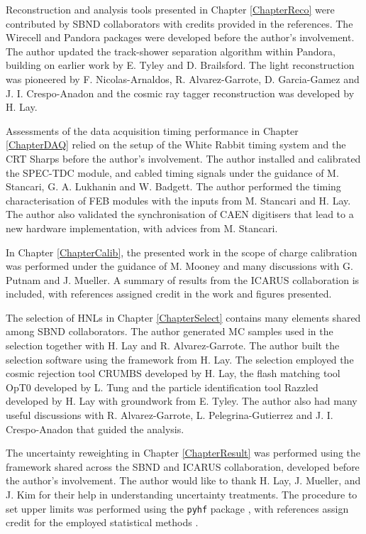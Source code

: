 \begin{declaration}
Reconstruction and analysis tools presented in Chapter \ref{ChapterReco} were contributed by SBND collaborators with credits provided in the references.
The Wirecell \cite{wirecell} and Pandora \cite{pandora} packages were developed before the author's involvement.
The author updated the track-shower separation algorithm within Pandora, building on earlier work by E. Tyley and D. Brailsford.
The light reconstruction was pioneered by F. Nicolas-Arnaldos, R. Alvarez-Garrote, D. Garcia-Gamez and J. I. Crespo-Anadon and the cosmic ray tagger reconstruction was developed by H. Lay.  

Assessments of the data acquisition timing performance in Chapter \ref{ChapterDAQ} relied on the setup of the White Rabbit timing system and the CRT Sharps before the author's involvement.
The author installed and calibrated the SPEC-TDC module, and cabled timing signals under the guidance of M. Stancari, G. A. Lukhanin and W. Badgett.
The author performed the timing characterisation of FEB modules with the inputs from M. Stancari and H. Lay.
The author also validated the synchronisation of CAEN digitisers that lead to a new hardware implementation, with advices from M. Stancari.

In Chapter \ref{ChapterCalib}, the presented work in the scope of charge calibration was performed under the guidance of M. Mooney and many discussions with G. Putnam and J. Mueller.
A summary of results from the ICARUS collaboration is included, with references assigned credit in the work and figures presented.

The selection of HNLs in Chapter \ref{ChapterSelect} contains many elements shared among SBND collaborators.
The author generated MC samples used in the selection together with H. Lay and R. Alvarez-Garrote.
The author built the selection software using the framework from H. Lay. 
The selection employed the cosmic rejection tool CRUMBS developed by H. Lay, the flash matching tool OpT0 developed by L. Tung and the particle identification tool Razzled developed by H. Lay with groundwork from E. Tyley.
The author also had many useful discussions with R. Alvarez-Garrote, L. Pelegrina-Gutierrez and J. I. Crespo-Anadon that guided the analysis.

The uncertainty reweighting in Chapter \ref{ChapterResult} was performed using the framework shared across the SBND and ICARUS collaboration, developed before the author's involvement.
The author would like to thank H. Lay, J. Mueller, and J. Kim for their help in understanding uncertainty treatments.
The procedure to set upper limits was performed using the \texttt{pyhf} package \cite{pyhf_joss}, with references assign credit for the employed statistical methods \cite{asymptotic_test, CLs_Junk, CLs_Read}.


\end{declaration}
